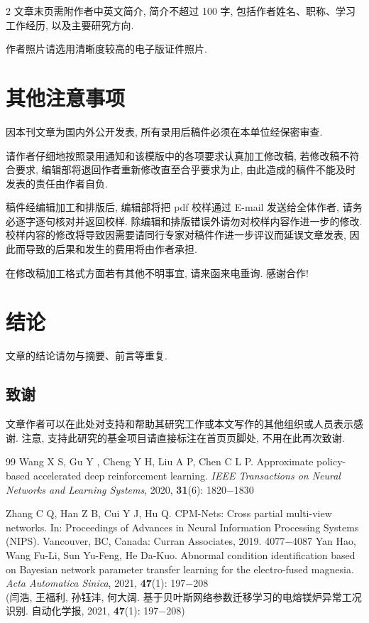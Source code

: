 \documentclass{aas}
\begin{document}
\begin{multicols*}{2}
文章末页需附作者中英文简介, 简介不超过 100 字, 包括作者姓名、职称、学习工作经历, 以及主要研究方向.


作者照片请选用清晰度较高的电子版证件照片.


\section{其他注意事项}

\begin{enumerate}[label = {\makebox[\ccwd][l]{\arabic*)}}, labelsep = 0pt,
                  itemindent = 3\ccwd, leftmargin = 0pt]
  \item 因本刊文章为国内外公开发表, 所有录用后稿件必须在本单位经保密审查.
  \item 请作者仔细地按照录用通知和该模版中的各项要求认真加工修改稿, 若修改稿不符合要求, 编辑部将退回作者重新修改直至合乎要求为止,  由此造成的稿件不能及时发表的责任由作者自负.
  \item 稿件经编辑加工和排版后, 编辑部将把 pdf 校样通过 E-mail 发送给全体作者, 请务必逐字逐句核对并返回校样. 除编辑和排版错误外请勿对校样内容作进一步的修改. 校样内容的修改将导致因需要请同行专家对稿件作进一步评议而延误文章发表, 因此而导致的后果和发生的费用将由作者承担.
  \item 在修改稿加工格式方面若有其他不明事宜, 请来函来电垂询. 感谢合作!
\end{enumerate}
\section{结论}

文章的结论请勿与摘要、前言等重复.

\subsection*{致谢}

文章作者可以在此处对支持和帮助其研究工作或本文写作的其他组织或人员表示感谢.
注意, 支持此研究的基金项目请直接标注在首页页脚处, 不用在此再次致谢.

\begin{thebibliography}{99}
 \addtolength{\itemsep}{0.2em} 
   Wang X S, Gu Y , Cheng Y H, Liu A P, Chen C L P. Approximate policy-based accelerated deep reinforcement learning. {\sl IEEE Transactions on Neural Networks and Learning Systems}, 2020, \textbf{31}(6): 1820$-$1830

   Zhang C Q, Han Z B, Cui Y J, Hu Q. CPM-Nets: Cross partial multi-view networks. In: Proceedings of Advances in Neural Information Processing Systems (NIPS). Vancouver, BC, Canada: Curran Associates, 2019. 4077$-$4087
  \newcolumn
   Yan Hao, Wang Fu-Li, Sun Yu-Feng, He Da-Kuo. Abnormal condition identification based on Bayesian network parameter transfer learning for the electro-fused magnesia. \textsl{Acta Automatica Sinica}, 2021, \textbf{47}(1): 197$-$208\\
  (闫浩, 王福利, 孙钰沣, 何大阔. 基于贝叶斯网络参数迁移学习的电熔镁炉异常工况识别. 自动化学报, 2021, \textbf{47}(1): 197$-$208)


\end{thebibliography}
\end{multicols*}
\end{document}
